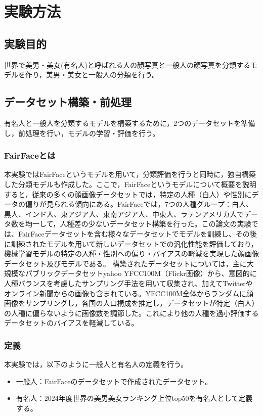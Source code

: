 \documentclass[a4paper,11pt,titlepage]{jsarticle}
\begin{document}
\section{実験方法}
\subsection{実験目的}
世界で美男・美女(有名人)と呼ばれる人の顔写真と一般人の顔写真を分類するモデルを作り，美男・美女と一般人の分類を行う。

\subsection{データセット構築・前処理}
有名人と一般人を分類するモデルを構築するために，2つのデータセットを準備し，前処理を行い，モデルの学習・評価を行う。

\subsubsection{FairFaceとは}
本実験ではFairFaceというモデルを用いて，分類評価を行うと同時に，独自構築した分類モデルも作成した。ここで，FairFaceというモデルについて概要を説明すると，従来の多くの顔画像データセットでは，特定の人種（白人）や性別にデータの偏りが見られる傾向にある。FairFaceでは，7つの人種グループ：白人、黒人、インド人、東アジア人、東南アジア人、中東人、ラテンアメリカ人でデータ数を均一して，人種差の少ないデータセット構築を行った。この論文の実験では、FairFaceデータセットを含む様々なデータセットでモデルを訓練し、その後に訓練されたモデルを用いて新しいデータセットでの汎化性能を評価しており，機械学習モデルの特定の人種・性別への偏り・バイアスの軽減を実現した顔画像データセット及びモデルである。
構築されたデータセットについては，主に大規模なパブリックデータセットyahoo YFCC100M（Flickr画像）から、意図的に人種バランスを考慮したサンプリング手法を用いて収集され、加えてTwitterやオンライン新聞からの画像も含まれている。YFCC100M全体からランダムに顔画像をサンプリングし，各国の人口構成を推定し，データセットが特定（白人）の人種に偏らないように画像数を調節した。これにより他の人種を過小評価するデータセットのバイアスを軽減している。




\subsubsection{定義}
本実験では，以下のように一般人と有名人の定義を行う。
\begin{itemize}
    \item 一般人：FairFaceのデータセットで作成されたデータセット。
    \item 有名人：2024年度世界の美男美女ランキング上位top50を有名人として定義する。
\end{itemize}
\end{document}

